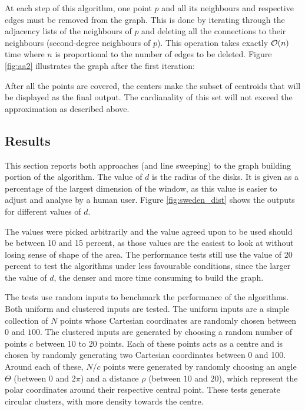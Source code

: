 At each step of this algorithm, one point $p$ and all its neighbours and respective edges must be removed from the graph. This is done by iterating through the adjacency lists of the neighbours of $p$ and deleting all the connections to their neighbours (second-degree neighbours of $p$). This operation takes exactly $\mathcal{O}(n)$ time where $n$ is proportional to the number of edges to be deleted. Figure \ref{fig:aa2} illustrates the graph after the first iteration:



After all the points are covered, the centers make the subset of centroids that will be displayed as the final output. The cardianality of this set will not exceed the approximation as described above.


\subsection{Results}
This section reports both approaches (\kdtrees and line sweeping) to the graph building portion of the algorithm. The value of $d$ is the radius of the disks. It is given as a percentage of the largest dimension of the window, as this value is easier to adjust and analyse by a human user. Figure \ref{fig:sweden_dist} shows the outputs for different values of $d$.


The values were picked arbitrarily and the value agreed upon to be used should be between 10 and 15 percent, as those values are the easiest to look at without losing sense of shape of the area. The performance tests still use the value of 20 percent to test the algorithms under less favourable conditions, since the larger the value of $d$, the denser and more time consuming to build the graph.

The tests use random inputs to benchmark the performance of the algorithms. Both uniform and clustered inputs are tested. The uniform inputs are a simple collection of $N$ points whose Cartesian coordinates are randomly chosen between $0$ and $100$. The clustered inputs are generated by choosing a random number of points $c$ between 10 to 20 points. Each of these points acts as a centre and is chosen by randomly generating two Cartesian coordinates between 0 and 100. Around each of these, $N/c$ points were generated by randomly choosing an angle $\Theta$ (between $0$ and $2\pi$) and a distance $\rho$ (between $10$ and $20$), which represent the polar coordinates around their respective central point. These tests generate circular clusters, with more density towards the centre.

